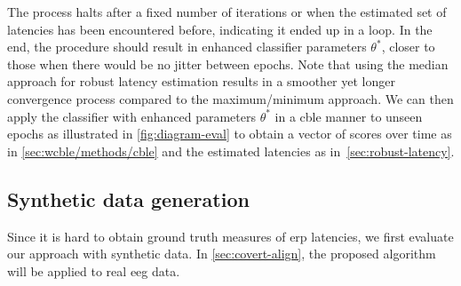 The process halts after a fixed number of iterations or when the estimated set
of latencies has been encountered before, indicating it ended up in a loop.
In the end, the procedure should result in enhanced classifier parameters $\theta^*$,
closer to those when there would be no jitter between epochs.
Note that using the median approach for robust latency estimation results in a
smoother yet longer convergence process compared to the maximum/minimum approach.
We can then apply the classifier with enhanced parameters $\theta^*$ in a \ac{cble}
manner to unseen epochs as illustrated in \cref{fig:diagram-eval} to obtain a
vector of scores over time as in \cref{sec:wcble/methods/cble} and the estimated latencies as
in~\cref{sec:robust-latency}.

\subsection{Synthetic data generation}
\label{sec:wcble/methods/simulation}
Since it is hard to obtain ground truth measures of \ac{erp} latencies, we
first evaluate our approach with synthetic data.
In \cref{sec:covert-align}, the proposed algorithm will be applied to real
\ac{eeg} data.

